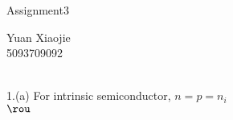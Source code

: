 \documentclass[11pt,oneside,a4paper]{article}
\begin{document}
\begin{center}Assignment3\\\end{center}
\begin{flushright}Yuan Xiaojie\\5093709092\\\end{flushright}

\ \\

1.\:(a) For intrinsic semiconductor, \(n=p=n_i\) \\

\hspace{8.5mm} \(\rou \) \\

\hspace{8.5mm} \(\) \\
\hspace{8.5mm} \(\) \\
\hspace{8.5mm} \(\) \\
\hspace{8.5mm} \(\) \\
\hspace{8.5mm} \(\) \\
\hspace{8.5mm} \(\) \\
\hspace{8.5mm} \(\) \\
\hspace{8.5mm} \(\) \\
\hspace{8.5mm} \(\) \\
\hspace{8.5mm} \(\) \\
\hspace{8.5mm} \(\) \\
\hspace{8.5mm} \(\) \\
\end{document}
